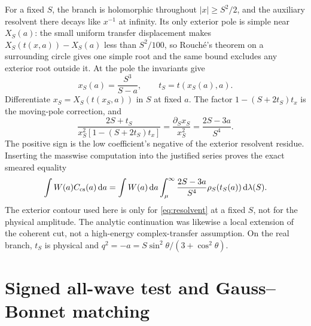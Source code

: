 \documentclass[11pt,a4paper]{article}
\theoremstyle{definition}
\theoremstyle{remark}
\newcommand{\dS}{\mathrm{d}}
\begin{document}
For a fixed $S$, the branch is holomorphic throughout $|x|\ge S^2/2$, and the auxiliary resolvent there decays like $x^{-1}$ at infinity. Its only exterior pole is simple near $X_S(a)$: the small uniform transfer displacement makes $X_S(t(x,a))-X_S(a)$ less than $S^2/100$, so Rouch\'e's theorem on a surrounding circle gives one simple root and the same bound excludes any exterior root outside it. At the pole the invariants give
\[
  x_S(a)=\frac{S^3}{S-a},\qquad
  t_S=t(x_S(a),a).
\]
Differentiate $x_S=X_S(t(x_S,a))$ in $S$ at fixed $a$. The factor $1-(S+2t_S)t_x$ is the moving-pole correction, and
\[
 \frac{2S+t_S}{x_S^2[1-(S+2t_S)t_x]}=
        \frac{\partial_S x_S}{x_S^2}=\frac{2S-3a}{S^4}.
\]
The positive sign is the low coefficient's negative of the exterior resolvent residue. Inserting the masswise computation into the justified series proves the exact smeared equality
\begin{equation}\label{eq:cs}
 \int W(a)C_{\rm cs}(a)\,\dS a
  =\int W(a)\,\dS a\int_\mu^\infty
      \frac{2S-3a}{S^4}\rho_S(t_S(a))\,\dS\lambda(S).
\end{equation}
The exterior contour used here is only for \eqref{eq:resolvent} at a fixed $S$, not for the physical amplitude. The analytic continuation was likewise a local extension of the coherent cut, not a high-energy complex-transfer assumption. On the real branch, $t_S$ is physical and $q^2=-a=S\sin^2\theta/(3+\cos^2\theta)$.

\section{Signed all-wave test and Gauss--Bonnet matching}\label{sec:matching}
\end{document}
